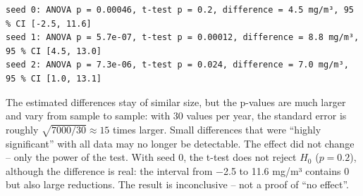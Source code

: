 \documentclass[
  letterpaper,
  DIV=11,
  numbers=noendperiod]{scrreprt}
\begin{document}
\begin{tcolorbox}
\begin{verbatim}
seed 0: ANOVA p = 0.00046, t-test p = 0.2, difference = 4.5 mg/m³, 95 % CI [-2.5, 11.6]
seed 1: ANOVA p = 5.7e-07, t-test p = 0.00012, difference = 8.8 mg/m³, 95 % CI [4.5, 13.0]
seed 2: ANOVA p = 7.3e-06, t-test p = 0.024, difference = 7.0 mg/m³, 95 % CI [1.0, 13.1]
\end{verbatim}

The estimated differences stay of similar size, but the p-values are
much larger and vary from sample to sample: with 30 values per year, the
standard error is roughly \(\sqrt{7000/30} \approx 15\) times larger.
Small differences that were ``highly significant'' with all data may no
longer be detectable. The effect did not change -- only the power of the
test. With seed 0, the t-test does not reject \(H_0\) (\(p = 0.2\)),
although the difference is real: the interval from −2.5 to 11.6 mg/m³
contains 0 but also large reductions. The result is inconclusive -- not
a proof of ``no effect''.

\end{tcolorbox}
\end{document}
